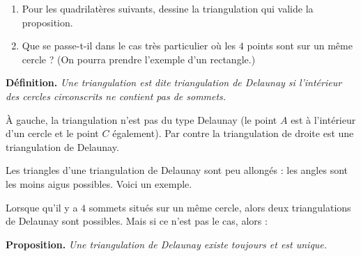\documentclass[class=report,crop=false, 12pt]{standalone}
\begin{document}
\begin{activite}
\begin{enumerate}
  \item Pour les quadrilatères suivants, dessine la triangulation qui valide la proposition.
  
\bigskip
\bigskip
\bigskip
\bigskip

 

\bigskip
\bigskip
\bigskip
\bigskip  
  \item Que se passe-t-il dans le cas très particulier où les $4$ points 
  sont sur un même cercle ? (On pourra prendre l'exemple d'un rectangle.)
\end{enumerate}


\end{activite}



\begin{activite}

\sauteligne

\begin{center}
\begin{minipage}{0.9\textwidth}
\textbf{Définition.}
\emph{
Une triangulation est dite \emph{triangulation de Delaunay} si l'intérieur des cercles circonscrits ne contient pas de sommets.
}
\end{minipage}
\end{center}

\`A gauche, la triangulation n'est pas du type Delaunay (le point $A$ est à l'intérieur d'un cercle et le point $C$ également). Par contre la triangulation de droite est une triangulation de Delaunay.



Les triangles d'une triangulation de Delaunay sont peu allongés : les angles sont les moins aigus possibles. Voici un exemple.




\bigskip
Lorsque qu'il y a $4$ sommets situés sur un même cercle, alors deux triangulations de Delaunay sont possibles. Mais si ce n'est pas le cas, alors :

\bigskip
\begin{center}
\begin{minipage}{0.9\textwidth}
\textbf{Proposition.} 
\emph{
Une triangulation de Delaunay existe toujours et est unique.
}
\end{minipage}
\end{center}


\end{activite}
\end{document}
